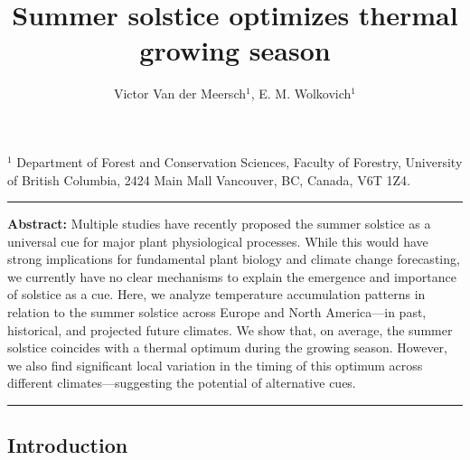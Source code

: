 \documentclass[11pt,letter]{article}
\begin{document}
\title{Summer solstice optimizes thermal growing season}

\author{Victor Van der Meersch$^{1}$, E. M. Wolkovich$^{1}$}
\date{}
\maketitle 

$^1$ Department of Forest and Conservation Sciences, Faculty of Forestry, University of British Columbia, 2424 Main Mall
Vancouver, BC, Canada, V6T 1Z4. \\

\noindent\rule{\textwidth}{0.3pt}
\textbf{Abstract:} Multiple studies have recently proposed the summer solstice as a universal cue for major plant physiological processes. While this would have strong implications for fundamental plant biology and climate change forecasting,  we currently have no clear mechanisms to explain the emergence and importance of solstice as a cue. Here, we analyze temperature accumulation patterns in relation to the summer solstice across Europe and North America---in past, historical, and projected future climates. 
We show that, on average, the summer solstice coincides with a thermal optimum during the growing season. However, we also find significant local variation in the timing of this optimum across different climates---suggesting the potential of alternative cues.


\noindent\rule{\textwidth}{0.3pt}

\vspace{0.cm}

\linenumbers

\subsection*{Introduction}
\end{document}
